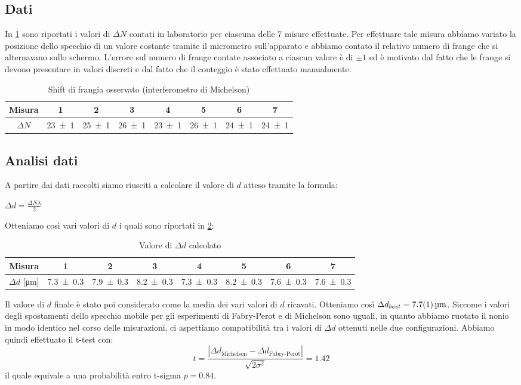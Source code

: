 \documentclass[a4paper]{article}
\begin{document}
\subsection{Dati}
In \cref{tab:micrometro-michelson} sono riportati i valori di $\Delta N$ contati in laboratorio per ciascuna delle 7 misure effettuate. Per effettuare tale misura abbiamo variato la posizione dello specchio di un valore costante tramite il micrometro sull'apparato e abbiamo contato il relativo numero di frange che si alternavano sullo schermo. L'errore sul numero di frange contate associato a ciascun valore è di $\pm1$ ed è motivato dal fatto che le frange si devono presentare in valori discreti e dal fatto che il conteggio è stato effettuato manualmente. 
\begin{table}[htbp]
\centering
\caption{Shift di frangia osservato (interferometro di Michelson)}
\begin{tabular}{cccccccc}
\toprule
Misura & 1 & 2 & 3 & 4 & 5 & 6 & 7 \\
\midrule
$\Delta N$ & \num{23 \pm 1} & \num{25 \pm 1} & \num{26 \pm 1} & \num{23 \pm 1} & \num{26 \pm 1} & \num{24 \pm 1} & \num{24 \pm 1} \\
\bottomrule
\end{tabular}
\label{tab:micrometro-michelson}
\end{table}
\subsection{Analisi dati}
A partire dai dati raccolti siamo riusciti a calcolare il valore di $d$ atteso tramite la formula: 
\begin{center}
    $\Delta d=\frac{\Delta N \lambda}{2}$
\end{center}
Otteniamo così vari valori di $d$ i quali sono riportati in \cref{tab:valori-d-michelson}:
\begin{table}[htbp]
\centering
\caption{Valore di $\Delta d$ calcolato}
\begin{tabular}{cccccccc}
\toprule
Misura & 1 & 2 & 3 & 4 & 5 & 6 & 7 \\
\midrule
$\Delta d$ [\si{\micro\meter}] & \num{7.3 \pm 0.3} & \num{7.9 \pm 0.3} & \num{8.2 \pm 0.3} & \num{7.3 \pm 0.3} & \num{8.2 \pm 0.3} & \num{7.6 \pm 0.3} & \num{7.6 \pm 0.3} \\
\bottomrule
\end{tabular}
\label{tab:valori-d-michelson}
\end{table} 
Il valore di $d$ finale è stato poi considerato come la media dei vari valori di $d$ ricavati. Otteniamo così $\Delta d_{best}=\SI{7.7 \pm 0.1}{\micro\meter}$.
Siccome i valori degli spostamenti dello specchio mobile per gli esperimenti di Fabry-Perot e di Michelson sono uguali, in quanto abbiamo ruotato il nonio in modo identico nel corso delle misurazioni, ci aspettiamo compatibilità tra i valori di $\Delta d$ ottenuti nelle due configurazioni. Abbiamo quindi effettuato il t-test con:
\begin{equation}
    t = \frac{|\Delta d_{\text{Michelson}} - \Delta d_{\text{Fabry-Perot}}|}{\sqrt{2\sigma^2}} = \num{1.42}
\end{equation}
il quale equivale a una probabilità entro t-sigma $p = \num{0.84}$.
\end{document}
